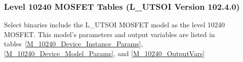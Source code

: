 


\clearpage
\subsubsection{Level 10240 MOSFET Tables (L\_UTSOI Version 102.4.0)}
Select \Xyce{} binaries include the L\_UTSOI MOSFET model as the level
10240 MOSFET.  This model's parameters and output variables are listed in tables~\ref{M_10240_Device_Instance_Params}, \ref{M_10240_Device_Model_Params}, and \ref{M_10240_OutputVars}





